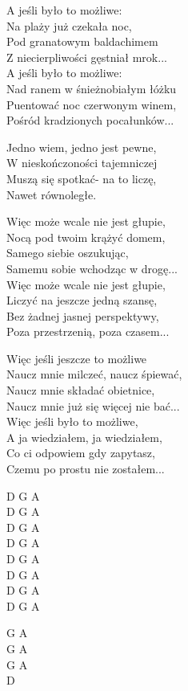 \begin{text}
A jeśli było to możliwe:\\
Na plaży już czekała noc,\\
Pod granatowym baldachimem\\
Z niecierpliwości gęstniał mrok...\\
A jeśli było to możliwe:\\
Nad ranem w śnieżnobiałym łóżku\\
Puentować noc czerwonym winem,\\
Pośród kradzionych pocałunków...

\vin Jedno wiem, jedno jest pewne,\\
\vin W nieskończoności tajemniczej\\
\vin Muszą się spotkać- na to liczę,\\
\vin Nawet równoległe.

Więc może wcale nie jest głupie,\\
Nocą pod twoim krążyć domem,\\
Samego siebie oszukując,\\
Samemu sobie wchodząc w drogę...\\
Więc może wcale nie jest głupie,\\
Liczyć na jeszcze jedną szansę,\\
Bez żadnej jasnej perspektywy,\\
Poza przestrzenią, poza czasem...

Więc jeśli jeszcze to możliwe\\
Naucz mnie milczeć, naucz śpiewać,\\
Naucz mnie składać obietnice,\\
Naucz mnie już się więcej nie bać...\\
Więc jeśli było to możliwe,\\
A ja wiedziałem, ja wiedziałem,\\
Co ci odpowiem gdy zapytasz,\\
Czemu po prostu nie zostałem...
\end{text}
\begin{chord}
    D G A\\
    D G A\\
    D G A\\
    D G A\\
    D G A\\
    D G A\\
    D G A\\
    D G A

    G A\\
    G A\\
    G A\\
    D
\end{chord}